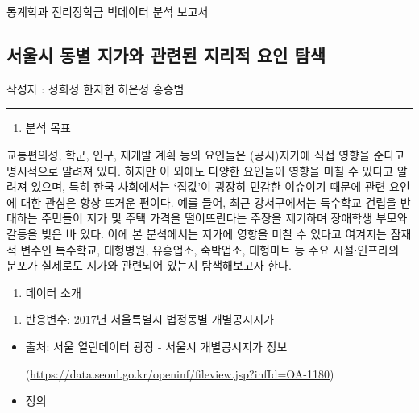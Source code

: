 \documentclass[]{article}
\author{}
\date{\vspace{-2.5em}}
\providecommand{\tightlist}{%
  \setlength{\itemsep}{0pt}\setlength{\parskip}{0pt}}
\begin{document}
통계학과 진리장학금 빅데이터 분석 보고서

\hypertarget{uxc11cuxc6b8uxc2dc-uxb3d9uxbcc4-uxc9c0uxac00uxc640-uxad00uxb828uxb41c-uxc9c0uxb9acuxc801-uxc694uxc778-uxd0d0uxc0c9}{%
\subsection{서울시 동별 지가와 관련된 지리적 요인
탐색}\label{uxc11cuxc6b8uxc2dc-uxb3d9uxbcc4-uxc9c0uxac00uxc640-uxad00uxb828uxb41c-uxc9c0uxb9acuxc801-uxc694uxc778-uxd0d0uxc0c9}}

작성자 : 정희정 한지현 허은정 홍승범

\begin{center}\rule{0.5\linewidth}{\linethickness}\end{center}

\begin{enumerate}
\def\labelenumi{\arabic{enumi}.}
\tightlist
\item
  분석 목표
\end{enumerate}

교통편의성, 학군, 인구, 재개발 계획 등의 요인들은 (공시)지가에 직접
영향을 준다고 명시적으로 알려져 있다. 하지만 이 외에도 다양한 요인들이
영향을 미칠 수 있다고 알려져 있으며, 특히 한국 사회에서는 `집값'이
굉장히 민감한 이슈이기 때문에 관련 요인에 대한 관심은 항상 뜨거운
편이다. 예를 들어, 최근 강서구에서는 특수학교 건립을 반대하는 주민들이
지가 및 주택 가격을 떨어뜨린다는 주장을 제기하며 장애학생 부모와 갈등을
빚은 바 있다. 이에 본 분석에서는 지가에 영향을 미칠 수 있다고 여겨지는
잠재적 변수인 특수학교, 대형병원, 유흥업소, 숙박업소, 대형마트 등 주요
시설⋅인프라의 분포가 실제로도 지가와 관련되어 있는지 탐색해보고자 한다.

\begin{enumerate}
\def\labelenumi{\arabic{enumi}.}
\setcounter{enumi}{1}
\tightlist
\item
  데이터 소개
\end{enumerate}

\begin{enumerate}
\def\labelenumi{\arabic{enumi})}
\tightlist
\item
  반응변수: 2017년 서울특별시 법정동별 개별공시지가
\end{enumerate}

\begin{itemize}
\item
  출처: 서울 열린데이터 광장 - 서울시 개별공시지가 정보

  (\url{https://data.seoul.go.kr/openinf/fileview.jsp?infId=OA-1180})
\item
  정의
\end{itemize}
\end{document}
